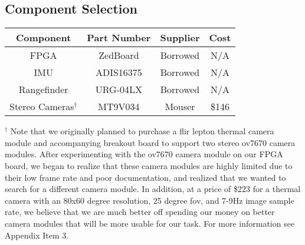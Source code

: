 \subsection{Component Selection}

\begin{center}
\begin{tabular}{ |c|c|c|c| } 
 \hline
 \textbf{Component} & \textbf{Part Number}  & \textbf{Supplier} & \textbf{Cost}  \\ \hline
 FPGA & ZedBoard & Borrowed & N/A  \\ \hline
 IMU & ADIS16375 & Borrowed & N/A  \\ \hline
 Rangefinder & URG-04LX & Borrowed & N/A  \\ \hline
 Stereo Cameras$^\dagger$ & MT9V034 & Mouser & \$146  \\ 
 \hline
\end{tabular}
\end{center}
$^\dagger$ Note that we originally planned to purchase a flir lepton thermal camera module and accompanying breakout board to support two stereo ov7670 camera modules. After experimenting with the ov7670 camera module on our FPGA board, we began to realize that these camera modules are highly limited due to their low frame rate and poor documentation, and realized that we wanted to search for a different camera module. In addition, at a price of \$223 for a thermal camera with an 80x60 degree resolution, 25 degree fov, and 7-9Hz image sample rate, we believe that we are much better off spending our money on better camera modules that will be more usable for our task. For more information see Appendix Item 3.